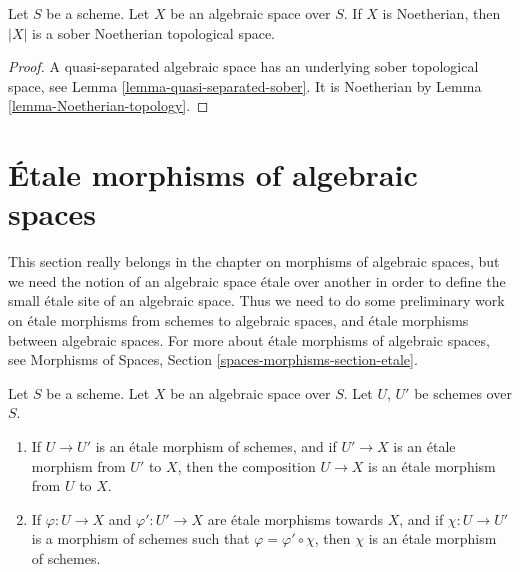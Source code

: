 \begin{lemma}
\label{lemma-Noetherian-sober}
Let $S$ be a scheme. Let $X$ be an algebraic space over $S$.
If $X$ is Noetherian, then $|X|$ is a sober Noetherian topological space.
\end{lemma}

\begin{proof}
A quasi-separated algebraic space has an underlying sober topological
space, see
Lemma \ref{lemma-quasi-separated-sober}.
It is Noetherian by
Lemma \ref{lemma-Noetherian-topology}.
\end{proof}




\section{\'Etale morphisms of algebraic spaces}
\label{section-etale-morphisms}

\noindent
This section really belongs in the chapter on morphisms of algebraic
spaces, but we need the notion of an algebraic space \'etale over another
in order to define the small \'etale site of an algebraic space.
Thus we need to do some preliminary work on \'etale morphisms from schemes to
algebraic spaces, and \'etale morphisms between algebraic spaces.
For more about \'etale morphisms of algebraic spaces, see
Morphisms of Spaces, Section \ref{spaces-morphisms-section-etale}.

\begin{lemma}
\label{lemma-etale-over-space}
Let $S$ be a scheme.
Let $X$ be an algebraic space over $S$.
Let $U$, $U'$ be schemes over $S$.
\begin{enumerate}
\item If $U \to U'$ is an \'etale morphism of schemes, and
if $U' \to X$ is an \'etale morphism from $U'$ to $X$, then the
composition $U \to X$ is an \'etale morphism from $U$ to $X$.
\item If $\varphi : U \to X$ and $\varphi' : U' \to X$ are
\'etale morphisms towards $X$, and if $\chi : U \to U'$ is a
morphism of schemes such that $\varphi = \varphi' \circ \chi$,
then $\chi$ is an \'etale morphism of schemes.
\end{enumerate}
\end{lemma}

